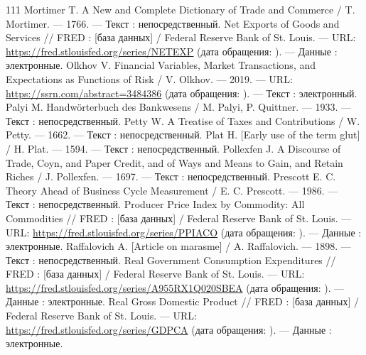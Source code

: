 \begin{RaggedRight}
\begin{thebibliography}{111}
     \hypertarget{bib:Mortimer-1766}{} Mortimer T. A New and Complete Dictionary of Trade and Commerce / T. Mortimer. --- 1766. --- Текст : непосредственный.
     \hypertarget{bib:FRED-NETEXP}{} Net Exports of Goods and Services // FRED : [база данных] / Federal Reserve Bank of St. Louis. --- URL: \url{https://fred.stlouisfed.org/series/NETEXP} (дата обращения: \bibaccessdate). --- Данные : электронные.
     \hypertarget{bib:Olkhov-2019}{} Olkhov V. Financial Variables, Market Transactions, and Expectations as Functions of Risk / V. Olkhov. --- 2019. --- URL: \url{https://ssrn.com/abstract=3484386} (дата обращения: \bibaccessdate). --- Текст : электронный.
     \hypertarget{bib:Palyi-1933}{} Palyi M. Handwörterbuch des Bankwesens / M. Palyi, P. Quittner. --- 1933. --- Текст : непосредственный.
     \hypertarget{bib:Petty-1662}{} Petty W. A Treatise of Taxes and Contributions / W. Petty. --- 1662. --- Текст : непосредственный.
     \hypertarget{bib:Plat-1594}{} Plat H. [Early use of the term \textquotedbl{}glut\textquotedbl{}] / H. Plat. --- 1594. --- Текст : непосредственный.
     \hypertarget{bib:Pollexfen-1697}{} Pollexfen J. A Discourse of Trade, Coyn, and Paper Credit, and of Ways and Means to Gain, and Retain Riches / J. Pollexfen. --- 1697. --- Текст : непосредственный.
     \hypertarget{bib:Prescott-1986}{} Prescott E. C. Theory Ahead of Business Cycle Measurement / E. C. Prescott. --- 1986. --- Текст : непосредственный.
     \hypertarget{bib:FRED-PPIACO}{} Producer Price Index by Commodity: All Commodities // FRED : [база данных] / Federal Reserve Bank of St. Louis. --- URL: \url{https://fred.stlouisfed.org/series/PPIACO} (дата обращения: \bibaccessdate). --- Данные : электронные.
     \hypertarget{bib:Raffalovich-1898}{} Raffalovich A. [Article on marasme] / A. Raffalovich. --- 1898. --- Текст : непосредственный.
     \hypertarget{bib:FRED-A955RX1Q020SBEA}{} Real Government Consumption Expenditures // FRED : [база данных] / Federal Reserve Bank of St. Louis. --- URL: \url{https://fred.stlouisfed.org/series/A955RX1Q020SBEA} (дата обращения: \bibaccessdate). --- Данные : электронные.
     \hypertarget{bib:FRED-GDPCA}{} Real Gross Domestic Product // FRED : [база данных] / Federal Reserve Bank of St. Louis. --- URL: \url{https://fred.stlouisfed.org/series/GDPCA} (дата обращения: \bibaccessdate). --- Данные : электронные.

\end{thebibliography}
\end{RaggedRight}
